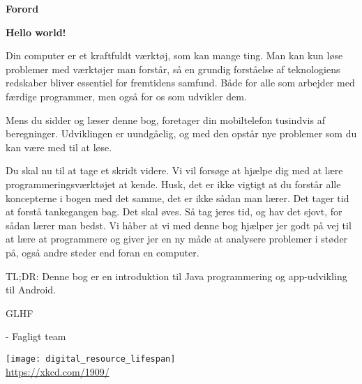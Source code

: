 \cleardoublepage
\begin{titlepage}
	{\centering
	\vspace{3cm}
	{\Huge\sffamily\bfseries Forord \par} \vspace{0.5cm}}
	\noindent
	
	
	{\large\bfseries Hello world! \par}
	
	Din computer er et kraftfuldt værktøj, som kan mange ting. Man kan kun løse problemer med værktøjer man forstår, så en grundig forståelse af teknologiens redskaber bliver essentiel for fremtidens samfund. Både for alle som arbejder med færdige programmer, men også for os som udvikler dem. 
	
	Mens du sidder og læser denne bog, foretager din mobiltelefon tusindvis af beregninger. Udviklingen er uundgåelig, og med den opstår nye problemer som du kan være med til at løse. 
	
	Du skal nu til at tage et skridt videre. Vi vil forsøge at hjælpe dig med at lære programmeringsværktøjet at kende.
	Husk, det er ikke vigtigt at du forstår alle koncepterne i bogen med det samme, det er ikke sådan man lærer.
	Det tager tid at forstå tankegangen bag. Det skal øves.
	Så tag jeres tid, og hav det sjovt, for sådan lærer man bedst.
	Vi håber at vi med denne bog hjælper jer godt på vej til at lære at programmere og giver jer en ny måde at analysere problemer i støder på, også andre steder end foran en computer.
	
	TL;DR: Denne bog er en introduktion til Java programmering og app-udvikling til Android. 
	
	GLHF
	
	- Fagligt team
	
	{\centering
	{\texttt{[image: digital\_resource\_lifespan]}\\
		\tiny \url{https://xkcd.com/1909/} \par} \vspace{0.5cm}}
\end{titlepage}
